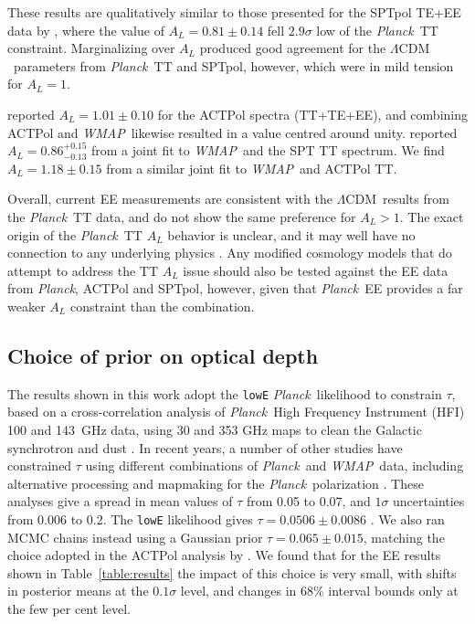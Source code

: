 \documentclass[twocolumn]{aastex63}
\newcommand{\wmap}{\textsl{WMAP}}
\newcommand{\planck}{\textsl{Planck}}
\newcommand{\lcdm}{\ensuremath{\Lambda\mathrm{CDM}}}
\begin{document}
These results are qualitatively similar to those presented for the SPTpol TE+EE data by \cite{henning/etal:2018}, where the value of $A_L=0.81\pm0.14$ fell $2.9\sigma$ low of the \planck\ TT constraint. Marginalizing over $A_L$ produced good agreement for the \lcdm\ parameters from \planck\ TT and SPTpol, however, which were in mild tension for $A_L=1$.

\cite{aiola/etal:2020} reported $A_L=1.01\pm0.10$ for the ACTPol spectra (TT+TE+EE), and combining ACTPol and \wmap\ likewise resulted in a value centred around unity. \cite{story/etal:2013} reported $A_L=0.86^{+0.15}_{-0.13}$ from a joint fit to \wmap\ and the SPT TT spectrum. We find $A_L=1.18\pm0.15$ from a similar joint fit to \wmap\ and ACTPol TT.

Overall, current EE measurements are consistent with the \lcdm\ results from the \planck\ TT data, and do not show the same preference for $A_L>1$. The exact origin of the \planck\ TT $A_L$ behavior is unclear, and it may well have no connection to any underlying physics \citep[see also, e.g.,][]{couchot/etal:2017,efstathiou/gratton:2019}. Any modified cosmology models that do attempt to address the TT $A_L$ issue should also be tested against the EE data from \planck, ACTPol and SPTpol, however, given that \planck\ EE provides a far weaker $A_L$ constraint than the combination.

\subsection{Choice of prior on optical depth}
\label{sec:resultstauprior}

The results shown in this work adopt the \texttt{lowE} \planck\ likelihood to constrain $\tau$, based on a cross-correlation analysis of \planck\ High Frequency Instrument (HFI) 100 and 143~GHz data, using 30 and 353 GHz maps to clean the Galactic synchrotron and dust \citep[see Section~2.2 of][for more details]{planck2016-l05}. In recent years, a number of other studies have constrained $\tau$ using different combinations of \planck\ and \wmap\ data, including alternative processing and mapmaking for the \planck\ polarization \citep[e.g.,][]{weiland/etal:2018,planck2020-LVII,beyondplanck1,natale/etal:2020}. These analyses give a spread in mean values of $\tau$ from 0.05 to 0.07, and $1\sigma$ uncertainties from 0.006 to 0.2. The \texttt{lowE} likelihood gives $\tau=0.0506\pm0.0086$ \citep{planck2016-l06}. We also ran MCMC chains instead using a Gaussian prior $\tau=0.065\pm0.015$, matching the choice adopted in the ACTPol analysis by \cite{aiola/etal:2020}. We found that for the EE results shown in Table~\ref{table:results} the impact of this choice is very small, with shifts in posterior means at the $0.1\sigma$ level, and changes in 68\% interval bounds only at the few per cent level.
\end{document}
